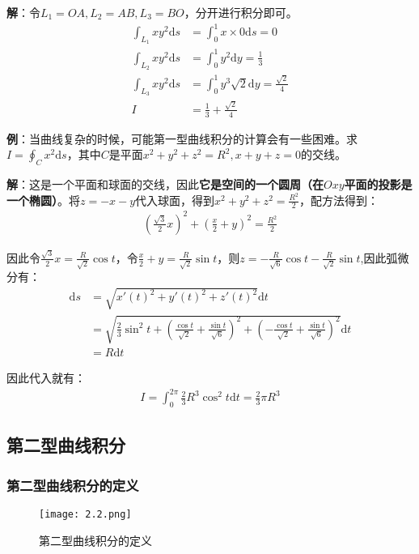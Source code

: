\documentclass{ctexart}
\let\oldtextbf\textbf
\renewcommand{\textbf}[1]{\textcolor{brown!50!red}{\oldtextbf{#1}}}
\begin{document}
\textbf{\color{brown!50!red}解}：令$L_1=OA,L_2=AB,L_3=BO$，分开进行积分即可。
\begin{align*} 
\int_{L_1}xy^2\mathrm{d}s&=\int_0^1x\times0\mathrm{d}s=0\\
 \int_{L_2}xy^2\mathrm{d}s&=\int_0^1 y^2\mathrm{d}y=\frac{1}{3}\\
\int_{L_3}xy^2\mathrm{d}s&=\int_0^1y^3\sqrt{2}\mathrm{d}y=\frac{\sqrt{2}}{4}\\
I&=\frac{1}{3}+\frac{\sqrt{2}}{4}
\end{align*}

\textbf{\color{brown!50!red}例}：当曲线复杂的时候，可能第一型曲线积分的计算会有一些困难。求$I=\oint_C x^2\mathrm{d}s$，其中$C$是平面$x^2+y^2+z^2=R^2,x+y+z=0$的交线。

\textbf{\color{brown!50!red}解}：这是一个平面和球面的交线，因此\textbf{\color{brown!50!red}它是空间的一个圆周（在$Oxy$平面的投影是一个椭圆）}。将$z=-x-y$代入球面，得到$x^2+y^2+z^2=\frac{R^2}{2}$，配方法得到：
\begin{align*}
    \left(\frac{\sqrt{3}}{2}x\right)^2+\left(\frac{x}{2}+y\right)^2=\frac{R^2}{2}
\end{align*}

因此令$\frac{\sqrt{3}}{2}x=\frac{R}{\sqrt{2}}\cos t$，令$\frac{x}{2}+y=\frac{R}{\sqrt{2}}\sin t$，则$z=-\frac{R}{\sqrt{6}}\cos t-\frac{R}{\sqrt{2}}\sin t$,因此弧微分有：
\begin{align*} 
\mathrm{d}s&=\sqrt{x'(t)^2+y'(t)^2+z'(t)^2}\mathrm{d}t\\
&=\sqrt{\frac{2}{3}\sin^2t+(\frac{\cos t}{\sqrt{2}}+\frac{\sin t}{\sqrt{6}})^2
+ (-\frac{\cos t}{\sqrt{2}}+\frac{\sin t}{\sqrt{6}})^2 }\mathrm{d}t\\
&=R\mathrm{d}t
\end{align*}

因此代入就有：
\begin{align*} 
I=\int_0^{2\pi}\frac{2}{3}R^3\cos^2t\mathrm{d}t=\frac{2}{3}\pi R^3   
\end{align*}

\subsection{第二型曲线积分}
\subsubsection{第二型曲线积分的定义}
\begin{figure}[H]    
\centering     
\renewcommand{\figurename}{图}     
\renewcommand{\thefigure}{2.2}    
\begin{myimagebox}[width=0.39\textwidth] %
\texttt{[image: 2.2.png]} %
\end{myimagebox}     
\caption{\label{fig:2.2}第二型曲线积分的定义}   
\end{figure}
\end{document}
